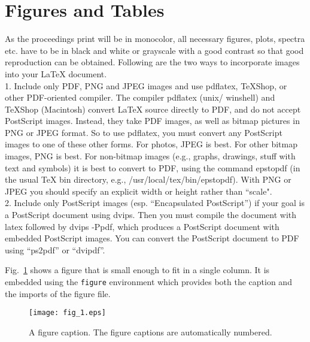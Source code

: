 \documentclass[twocolumn,amsmath,amssymb]{snp}
\begin{document}
\section*{Figures and Tables}
As the proceedings print will be in monocolor, all necessary figures, plots, spectra etc. have to be in 
black and white or grayscale with a good contrast so that good reproduction can be obtained. 
Following are the two ways to incorporate images into your LaTeX document.\\
1. Include only PDF, PNG and JPEG images and use pdflatex, TeXShop, or other PDF-oriented compiler. The compiler pdflatex (unix/ winshell)  and TeXShop (Macintosh) convert LaTeX source directly to PDF, and do not accept PostScript images. Instead, they take PDF images, as well as bitmap pictures in PNG or JPEG format. So to use pdflatex, you must convert any PostScript images to one of these other forms. For photos, JPEG is best. For other bitmap images, PNG is best. For non-bitmap
images (e.g., graphs, drawings, stuff with text and symbols) it is best to convert to PDF, using the command epstopdf (in the usual TeX bin directory, e.g., /usr/local/tex/bin/epstopdf). With PNG or JPEG you should specify an explicit width or height rather than ``scale".\\
2. Include only PostScript images (esp. ``Encapsulated PostScript'') if your
goal is a PostScript document using dvips. Then you must compile the document with latex followed by dvips -Ppdf, which
produces a PostScript document with embedded PostScript images. You can convert
the PostScript document to PDF using ``ps2pdf'' or ``dvipdf''.

Fig.~\ref{fig1} shows a figure that is small enough to
fit in a single column. It is embedded using the \texttt{figure}
environment which provides both the caption and the imports of the figure
file.
\begin{figure}
\texttt{[image: fig\_1.eps]}%
\caption{\label{fig1} A figure caption. The figure captions are
automatically numbered.}
\end{figure}
\end{document}
